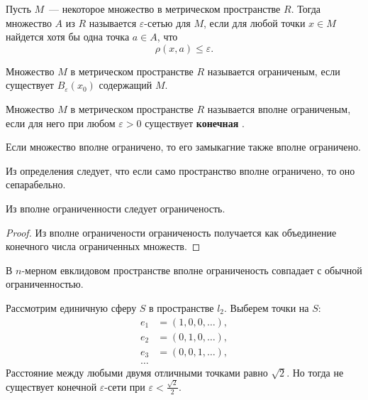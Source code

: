 \begin{definition}\label{varepsilon-net}
    Пусть $M$~--- некоторое множество в метрическом пространстве $R$. Тогда множество $A$ из $R$ называется $\varepsilon$-сетью для $M$, если для любой точки $x \in M$ найдется хотя бы одна точка $a \in A$, что
    \[\rho(x, a) \leqslant \varepsilon.\]
\end{definition}

\begin{definition}[Ограниченость]
    Множество $M$ в метрическом пространстве $R$ называется ограниченым, если существует $B_\varepsilon(x_0)$ содержащий $M$.
\end{definition}

\begin{definition}
    Множество $M$ в метрическом пространстве $R$ называется вполне ограниченым, если для него при любом $\varepsilon > 0$ существует \textbf{конечная} .
\end{definition}

\begin{note}
    Если множество вполне ограничено, то его замыкагние также вполне ограничено.
\end{note}

\begin{note}
    Из определения следует, что если само пространство вполне ограничено, то оно сепарабельно.
\end{note}

\begin{note}
    Из вполне ограниченности следует ограниченость.
\end{note}
\begin{proof}
    Из вполне ограничености ограниченость получается как объединение конечного числа ограниченных множеств.
\end{proof}

\begin{note}
    В $n$-мерном евклидовом пространстве вполне ограниченость совпадает с обычной ограниченностью.
\end{note}

\begin{counterexample}
    Рассмотрим единичную сферу $S$ в пространстве $l_2$. Выберем точки на $S$: 
    \begin{align*}
    e_1 &= (1, 0, 0, \ldots),\\
    e_2 &= (0, 1, 0, \ldots),\\
    e_3 &= (0, 0, 1, \ldots),\\
    \ldots
    \end{align*}
    Расстояние между любыми двумя отличными точками равно $\sqrt{2}$. Но тогда не существует конечной $\varepsilon$-сети при $\varepsilon < \frac{\sqrt{2}}{2}$.
\end{counterexample}

